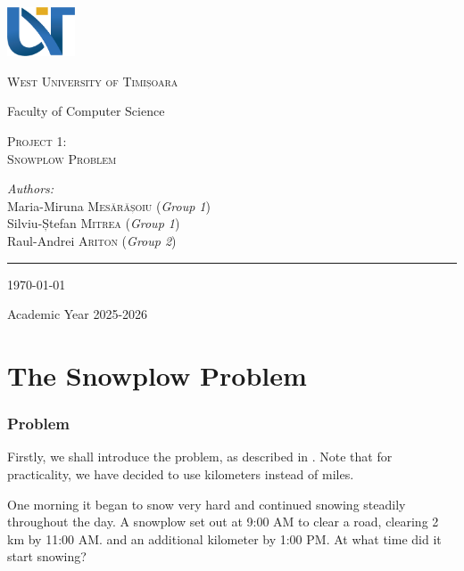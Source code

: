 \documentclass[a4paper,12pt]{article}
\begin{document}
\begin{titlepage}
	\vspace*{-3cm}
	\centering
		\includegraphics[width=2cm]{assets/uvt_logo_en.png}

	{\scshape\LARGE West University of Timișoara\par}

	\vspace{1cm}

	{\large Faculty of Computer Science}

	\vspace{.1\textheight}
	{ \LARGE \scshape Project 1: \\ Snowplow Problem \par}

		\vspace{.1\linewidth}

			{\emph{Authors:} \\
			Maria-Miruna \textsc{Mesărășoiu} (\textit{Group 1}) \\
            Silviu-Ștefan \textsc{Mitrea} (\textit{Group 1}) \\
            Raul-Andrei \textsc{Ariton} (\textit{Group 2})    
            }

			\vfill

			\rule{.4\textwidth}{.4pt}

	{\large \today\par
	Academic Year 2025-2026\par}
\end{titlepage}

\tableofcontents \newpage

\part{The Snowplow Problem} \label{firstpart}
\section{Problem}
    Firstly, we shall introduce the problem, as described in \cite[pp.~84--85]{Kent_Nagle2018-ig}. Note that for practicality, we have decided to use kilometers instead of miles.

    \begin{framed}
        \noindent One morning it began to snow very hard and continued snowing steadily throughout the day. A snowplow set out at 9:00 AM to clear a road, clearing 2 \unit{\kilo\meter} by 11:00 AM. and an additional kilometer by 1:00 PM. At what time did it start snowing?
    \end{framed}
    
\end{document}
